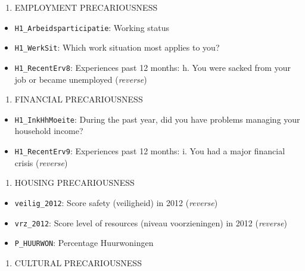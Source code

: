 \documentclass[
]{article}
\providecommand{\tightlist}{%
  \setlength{\itemsep}{0pt}\setlength{\parskip}{0pt}}\usepackage{longtable,booktabs,array}
\begin{document}
\begin{enumerate}
\def\labelenumi{\arabic{enumi}.}
\tightlist
\item
  EMPLOYMENT PRECARIOUSNESS
\end{enumerate}

\begin{itemize}
\tightlist
\item
  \texttt{H1\_Arbeidsparticipatie}: Working status
\item
  \texttt{H1\_WerkSit}: Which work situation most applies to you?
\item
  \texttt{H1\_RecentErv8}: Experiences past 12 months: h. You were
  sacked from your job or became unemployed (\emph{reverse})
\end{itemize}

\begin{enumerate}
\def\labelenumi{\arabic{enumi}.}
\setcounter{enumi}{1}
\tightlist
\item
  FINANCIAL PRECARIOUSNESS
\end{enumerate}

\begin{itemize}
\tightlist
\item
  \texttt{H1\_InkHhMoeite}: During the past year, did you have problems
  managing your household income?
\item
  \texttt{H1\_RecentErv9}: Experiences past 12 months: i. You had a
  major financial crisis (\emph{reverse})
\end{itemize}

\begin{enumerate}
\def\labelenumi{\arabic{enumi}.}
\setcounter{enumi}{2}
\tightlist
\item
  HOUSING PRECARIOUSNESS
\end{enumerate}

\begin{itemize}
\tightlist
\item
  \texttt{veilig\_2012}: Score safety (veiligheid) in 2012
  (\emph{reverse})
\item
  \texttt{vrz\_2012}: Score level of resources (niveau voorzieningen) in
  2012 (\emph{reverse})
\item
  \texttt{P\_HUURWON}: Percentage Huurwoningen
\end{itemize}

\begin{enumerate}
\def\labelenumi{\arabic{enumi}.}
\setcounter{enumi}{3}
\tightlist
\item
  CULTURAL PRECARIOUSNESS
\end{enumerate}
\end{document}
